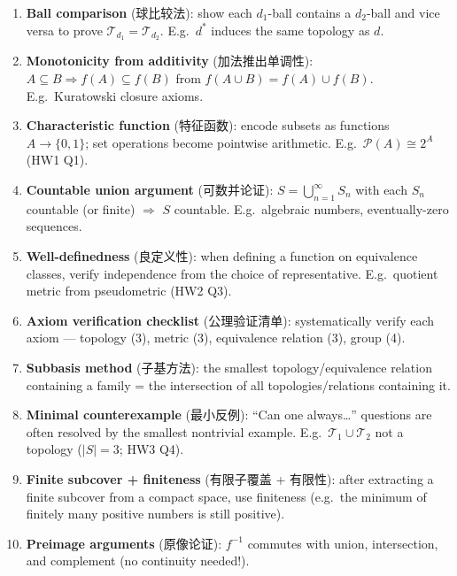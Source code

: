 \documentclass{article}
\begin{document}
\begin{enumerate}
  \item \textbf{Ball comparison} (球比较法): show each $d_1$-ball contains a $d_2$-ball
  and vice versa to prove $\mathcal{T}_{d_1}=\mathcal{T}_{d_2}$.
  E.g.\ $d^*$ induces the same topology as $d$.

  \item \textbf{Monotonicity from additivity} (加法推出单调性):
  $A\subseteq B\Rightarrow f(A)\subseteq f(B)$ from $f(A\cup B)=f(A)\cup f(B)$.
  E.g.\ Kuratowski closure axioms.

  \item \textbf{Characteristic function} (特征函数): encode subsets as functions
  $A\to\{0,1\}$; set operations become pointwise arithmetic.
  E.g.\ $\mathcal{P}(A)\cong 2^A$ (HW1 Q1).

  \item \textbf{Countable union argument} (可数并论证):
  $S=\bigcup_{n=1}^\infty S_n$ with each $S_n$ countable (or finite) $\Rightarrow$
  $S$ countable. E.g.\ algebraic numbers, eventually-zero sequences.

  \item \textbf{Well-definedness} (良定义性): when defining a function on equivalence classes,
  verify independence from the choice of representative.
  E.g.\ quotient metric from pseudometric (HW2 Q3).

  \item \textbf{Axiom verification checklist} (公理验证清单): systematically verify
  each axiom --- topology (3), metric (3), equivalence relation (3), group (4).

  \item \textbf{Subbasis method} (子基方法): the smallest topology/equivalence relation
  containing a family = the intersection of all topologies/relations containing it.

  \item \textbf{Minimal counterexample} (最小反例): ``Can one always\ldots'' questions
  are often resolved by the smallest nontrivial example.
  E.g.\ $\mathcal{T}_1\cup\mathcal{T}_2$ not a topology ($|S|=3$; HW3 Q4).

  \item \textbf{Finite subcover + finiteness} (有限子覆盖 + 有限性): after extracting
  a finite subcover from a compact space, use finiteness (e.g.\ the minimum of finitely
  many positive numbers is still positive).

  \item \textbf{Preimage arguments} (原像论证): $f^{-1}$ commutes with union, intersection,
  and complement (no continuity needed!).
\end{enumerate}
\end{document}
